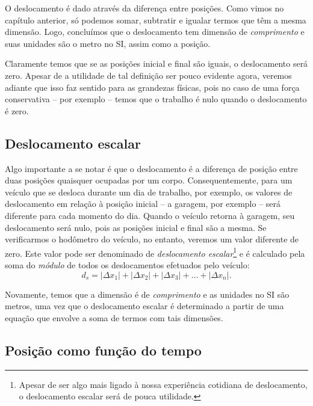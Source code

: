 O deslocamento é dado através da diferença entre posições. Como vimos no capítulo anterior, só podemos somar, subtratir e igualar termos que têm a mesma dimensão. Logo, concluímos que o deslocamento tem dimensão de \emph{comprimento} e suas unidades são o metro no SI, assim como a posição.

Claramente temos que se as posições inicial e final são iguais, o deslocamento será zero. Apesar de a utilidade de tal definição ser pouco evidente agora, veremos adiante que isso faz sentido para as grandezas físicas, pois no caso de uma força conservativa -- por exemplo -- temos que o trabalho é nulo quando o deslocamento é zero.

\subsection{Deslocamento escalar}

Algo importante a se notar é que o deslocamento é a diferença de posição entre duas posições quaisquer ocupadas por um corpo. Consequentemente, para um veículo que se desloca durante um dia de trabalho, por exemplo, os valores de deslocamento em relação à posição inicial -- a garagem, por exemplo -- será diferente para cada momento do dia. Quando o veículo retorna à garagem, seu deslocamento será nulo, pois as posições inicial e final são a mesma. Se verificarmos o hodômetro do veículo, no entanto, veremos um valor diferente de zero. Este valor pode ser denominado de \emph{deslocamento escalar}\footnote{Apesar de ser algo mais ligado à nossa experiência cotidiana de deslocamento, o deslocamento escalar será de pouca utilidade.} e é calculado pela soma do \emph{módulo} de todos os deslocamentos efetuados pelo veículo:
\begin{equation}
  d_s = |\Delta x_1| + |\Delta x_2| + |\Delta x_3| + \dots + |\Delta x_n|.
\end{equation}

Novamente, temos que a dimensão é de \emph{comprimento} e as unidades no SI são metros, uma vez que o deslocamento escalar é determinado a partir de uma equação que envolve a soma de termos com tais dimensões.


\subsection{Posição como função do tempo}


